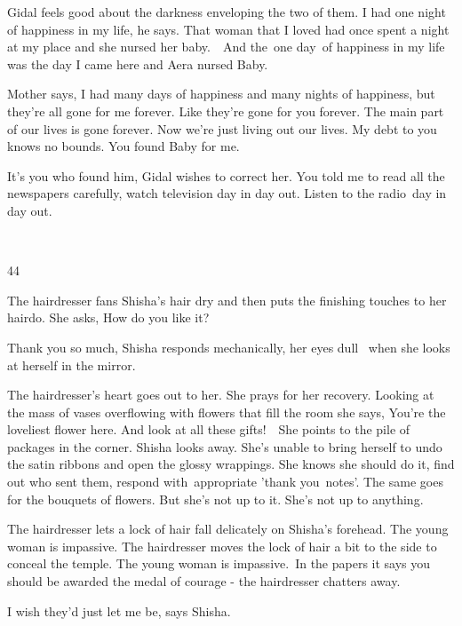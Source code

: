 \documentclass[twoside,11pt]{book}
\begin{document}
Gidal feels good about the darkness enveloping the two of them. {\textquotedbl}I had one night of happiness in my
life,{\textquotedbl} he says. {\textquotedbl}That woman that I loved had once spent a night at my place and she nursed
her baby.\ \ And the{\ }one day\textit{\ }of happiness in my life was the day I
came here and Aera nursed Baby.{\textquotedbl} 

Mother says, {\textquotedbl}I had many days of happiness and many nights of happiness, but they're all gone for me
forever. Like they're gone for you forever. The main part of our lives is gone forever. Now we're just living out our
lives. My debt to you knows no bounds. You found Baby for me.{\textquotedbl} 

{\textquotedbl}It's you who found him,{\textquotedbl} Gidal wishes to correct her. {\textquotedbl}You told me to read
all the newspapers carefully, watch television day in day out. Listen to the radio{\ }day in day
out.{\textquotedbl}

~

44 

The hairdresser fans Shisha's hair dry and then puts the finishing touches to her hairdo. She asks, {\textquotedbl}How
do you like it?{\textquotedbl} 

{\textquotedbl}Thank you so much,{\textquotedbl} Shisha responds mechanically, her eyes dull ~when she looks at herself
in the mirror. 

The hairdresser's heart goes out to her. She prays for her recovery. Looking at the mass of vases overflowing with
flowers that fill the room she says, {\textquotedbl}You're the loveliest flower here. And look at all these
gifts!{\textquotedbl}\ \ She points to the pile of packages in the corner. Shisha looks away. She's unable to bring
herself to undo the satin ribbons and open the glossy wrappings. She knows she should do it, find out who sent them,
respond with~appropriate {}'thank you\ notes{}'. The same goes for the bouquets of flowers. But she's not up to it.
She's not up to anything. 

The hairdresser lets a lock of hair fall delicately on Shisha's forehead. The young woman is impassive. The hairdresser
moves the lock of hair a bit to the side to conceal the temple. The young woman is
impassive.{\ }{\textquotedbl}In the papers it says you should be awarded the
medal of courage -{\textquotedbl} the hairdresser chatters away. 

{\textquotedbl}I wish they'd just let me be,{\textquotedbl} says Shisha{.}
\end{document}
